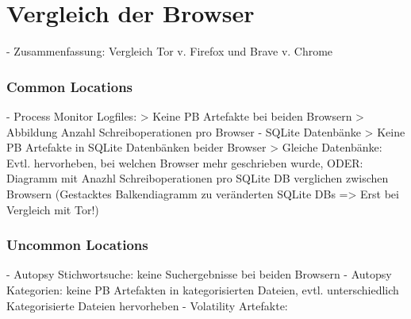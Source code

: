 \chapter{Vergleich der Browser}
\label{chapter:vergleich-der-browser}

- Zusammenfassung: Vergleich Tor v. Firefox und Brave v. Chrome

\subsection*{Common Locations}
- Process Monitor Logfiles: 
	> Keine PB Artefakte bei beiden Browsern
	> Abbildung Anzahl Schreiboperationen pro Browser
- SQLite Datenbänke
	> Keine PB Artefakte in SQLite Datenbänken beider Browser
	> Gleiche Datenbänke: Evtl. hervorheben, bei welchen Browser mehr geschrieben wurde, ODER: Diagramm mit Anazhl Schreiboperationen pro SQLite DB verglichen zwischen Browsern
		(Gestacktes Balkendiagramm zu veränderten SQLite DBs => Erst bei Vergleich mit Tor!)

\subsection*{Uncommon Locations}
- Autopsy Stichwortsuche: keine Suchergebnisse bei beiden Browsern
- Autopsy Kategorien: keine PB Artefakten in kategorisierten Dateien, evtl. unterschiedlich Kategorisierte Dateien hervorheben
- Volatility Artefakte:




